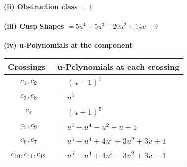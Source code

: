 \documentclass[1p]{elsarticle_modified}
\theoremstyle{definition}
\begin{document}
\flushleft \textbf{(ii) Obstruction class $= 1$}\\~\\
\flushleft \textbf{(iii) Cusp Shapes $= 5 u^4+5 u^3+20 u^2+14 u+9$}\\~\\
\newpage\renewcommand{\arraystretch}{1}
\flushleft \textbf{(iv) u-Polynomials at the component}\newline \\
\begin{tabular}{m{50pt}|m{274pt}}
Crossings & \hspace{64pt}u-Polynomials at each crossing \\
\hline $$\begin{aligned}c_{1},c_{2}\end{aligned}$$&$\begin{aligned}
&(u-1)^5
\end{aligned}$\\
\hline $$\begin{aligned}c_{3},c_{8}\end{aligned}$$&$\begin{aligned}
&u^5
\end{aligned}$\\
\hline $$\begin{aligned}c_{4}\end{aligned}$$&$\begin{aligned}
&(u+1)^5
\end{aligned}$\\
\hline $$\begin{aligned}c_{5},c_{9}\end{aligned}$$&$\begin{aligned}
&u^5+u^4- u^2+u+1
\end{aligned}$\\
\hline $$\begin{aligned}c_{6},c_{7}\end{aligned}$$&$\begin{aligned}
&u^5+u^4+4 u^3+3 u^2+3 u+1
\end{aligned}$\\
\hline $$\begin{aligned}c_{10},c_{11},c_{12}\end{aligned}$$&$\begin{aligned}
&u^5- u^4+4 u^3-3 u^2+3 u-1
\end{aligned}$\\
\hline
\end{tabular}\\~\\
\end{document}
